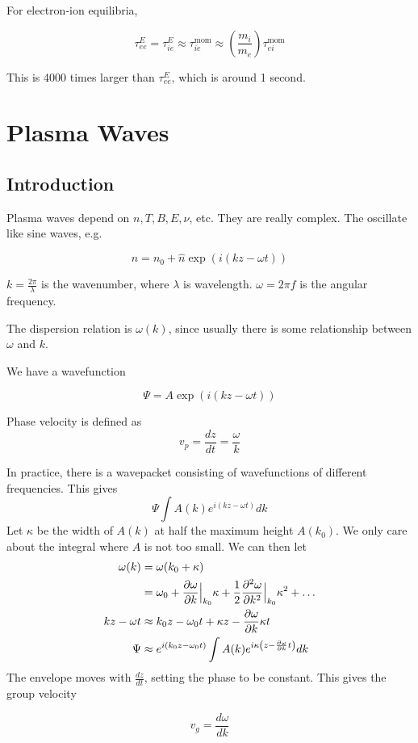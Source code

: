 \documentclass[12pt]{article}
\begin{document}
For electron-ion equilibria,

$$\tau_{ee}^E = \tau_{ie}^E \approx \tau_{ie}^{\text{mom}} \approx \left(\frac{m_i}{m_e}\right)\tau_{ei}^{\text{mom}}$$

This is 4000 times larger than $\tau_{ee}^E$, which is around 1 second.

\section{Plasma Waves}

\subsection{Introduction}

Plasma waves depend on $n, T, B, E, \nu$, etc. They are really complex. The oscillate like sine waves, e.g.

$$n = n_0 + \hat n \exp(i(kz-\omega t))$$

$k = \frac{2\pi}{\lambda}$ is the wavenumber, where $\lambda$ is wavelength. $\omega = 2\pi f$ is the angular frequency.

\begin{defn}
    The dispersion relation is $\omega(k)$, since usually there is some relationship between $\omega$ and $k$.
\end{defn}

We have a wavefunction

$$\Psi = A\exp(i(kz-\omega t))$$

\begin{defn}
    Phase velocity is defined as
    $$v_p = \frac{dz}{dt} = \frac{\omega}{k}$$
\end{defn}

In practice, there is a wavepacket consisting of wavefunctions of different frequencies. This gives
$$\Psi \int A(k)e^{i(kz - \omega t)} dk$$
Let $\kappa$ be the width of $A(k)$ at half the maximum height $A(k_0)$. We only care about the integral where $A$ is not too small. We can then let
\begin{align*}
    \omega(k) &= \omega(k_0 + \kappa) \\
              &= \omega_0 + \frac{\partial \omega}{\partial k} \Big |_{k_0} \kappa + \frac{1}{2} \frac{\partial ^2\omega}{\partial k^2} \Big |_{k_0} \kappa^2 + \dots \\
    kz - \omega t &\approx k_0z - \omega_0 t + \kappa z - \frac{\partial \omega}{\partial k}\kappa t \\
    \Psi &\approx e^{i(k_0z-\omega_0t)} \int A(k) e^{i\kappa\left(z - \frac{\partial \omega}{\partial k}t\right)}dk
\end{align*}
The envelope moves with $\frac{dz}{dt}$, setting the phase to be constant. This gives the group velocity
\begin{defn}
    $$v_g = \frac{d\omega}{dk}$$
\end{defn}
\end{document}
